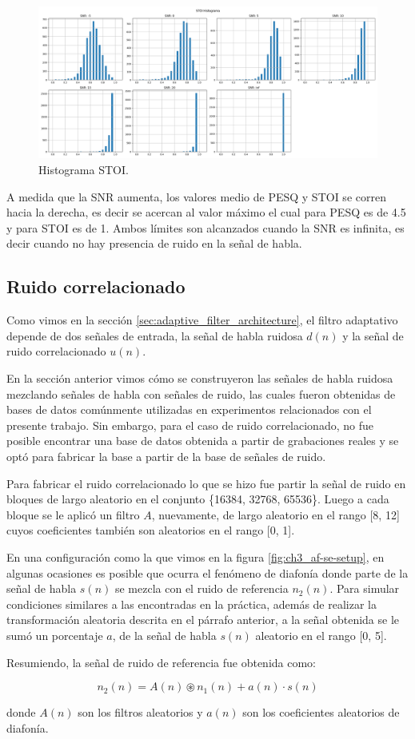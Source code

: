 \begin{figure}[H]
	\centering
	\centerline{\includegraphics[scale=0.35]{images/ch5/stoi_aggregated.png}}
	\caption{Histograma STOI.}
	\label{fig:ch5_stoi_histogram}
\end{figure}

A medida que la SNR aumenta, los valores medio de PESQ y STOI se corren hacia la derecha, es decir se acercan al valor máximo el cual para PESQ es de 4.5 y para STOI es de 1. Ambos límites son alcanzados cuando la SNR es infinita, es decir cuando no hay presencia de ruido en la señal de habla.

\subsection{Ruido correlacionado}

Como vimos en la sección \ref{sec:adaptive_filter_architecture}, el filtro adaptativo depende de dos señales de entrada, la señal de habla ruidosa $d(n)$ y la señal de ruido correlacionado $u(n)$. 

En la sección anterior vimos cómo se construyeron las señales de habla ruidosa mezclando señales de habla con señales de ruido, las cuales fueron obtenidas de bases de datos comúnmente utilizadas en experimentos relacionados con el presente trabajo. Sin embargo, para el caso de ruido correlacionado, no fue posible encontrar una base de datos obtenida a partir de grabaciones reales y se optó para fabricar la base a partir de la base de señales de ruido.

Para fabricar el ruido correlacionado lo que se hizo fue partir la señal de ruido en bloques de largo aleatorio en el conjunto \{16384, 32768, 65536\}. Luego a cada bloque se le aplicó un filtro $A$, nuevamente, de largo aleatorio en el rango [8, 12] cuyos coeficientes también son aleatorios en el rango [0, 1].

En una configuración como la que vimos en la figura \ref{fig:ch3_af-se-setup}, en algunas ocasiones es posible que ocurra el fenómeno de diafonía donde parte de la señal de habla $s(n)$ se mezcla con el ruido de referencia $n_2(n)$. Para simular condiciones similares a las encontradas en la práctica, además de realizar la transformación aleatoria descrita en el párrafo anterior, a la señal obtenida se le sumó un porcentaje $a$, de la señal de habla $s(n)$ aleatorio en el rango [0, 5].

Resumiendo, la señal de ruido de referencia fue obtenida como:

\begin{equation*}
	n_2(n) = A(n) \circledast n_1(n) + a(n) \cdot s(n)
\end{equation*}

\noindent donde $A(n)$ son los filtros aleatorios y $a(n)$ son los coeficientes aleatorios de diafonía.